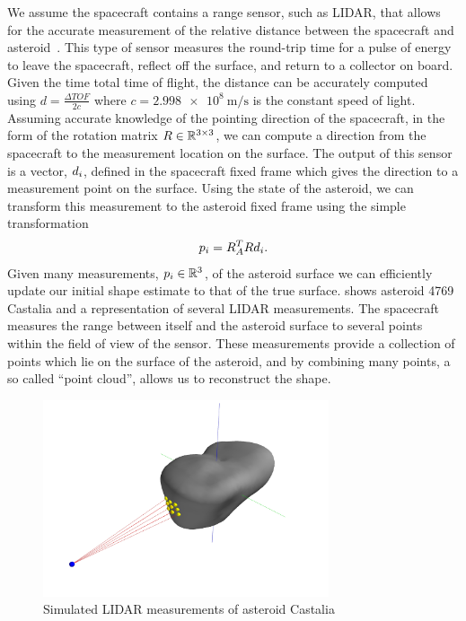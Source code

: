 \documentclass[journal]{new-aiaa}
\begin{document}
We assume the spacecraft contains a range sensor, such as LIDAR, that allows for the accurate measurement of the relative distance between the spacecraft and asteroid~\cite{zuber1997,zuber2000}.
This type of sensor measures the round-trip time for a pulse of energy to leave the spacecraft, reflect off the surface, and return to a collector on board.
Given the time total time of flight, the distance can be accurately computed using \( d = \frac{\Delta TOF}{2 c} \) where \( c = \SI{2.998e8}{\meter\per\second}\) is the constant speed of light.
Assuming accurate knowledge of the pointing direction of the spacecraft, in the form of the rotation matrix \( R \in \mathbb{R}^{3 \times 3 } \), we can compute a direction from the spacecraft to the measurement location on the surface.
The output of this sensor is a vector, \( d_i \), defined in the spacecraft fixed frame which gives the direction to a measurement point on the surface. 
Using the state of the asteroid, we can transform this measurement to the asteroid fixed frame using the simple transformation
\begin{align*}
    p_i = R_A^T R d_i .
\end{align*}
Given many measurements, \( p_i \in \mathbb{R}^3 \), of the asteroid surface we can efficiently update our initial shape estimate to that of the true surface.
 shows asteroid 4769 Castalia and a representation of several LIDAR measurements. 
The spacecraft measures the range between itself and the asteroid surface to several points within the field of view of the sensor. 
These measurements provide a collection of points which lie on the surface of the asteroid, and by combining many points, a so called ``point cloud'', allows us to reconstruct the shape.
\begin{figure}
    \centering
    \includegraphics[width=0.75\textwidth]{figures/castalia_raycasting_plot.jpg}
    \caption{Simulated LIDAR measurements of asteroid Castalia~\label{fig:lidar_example}}
\end{figure}
\end{document}

